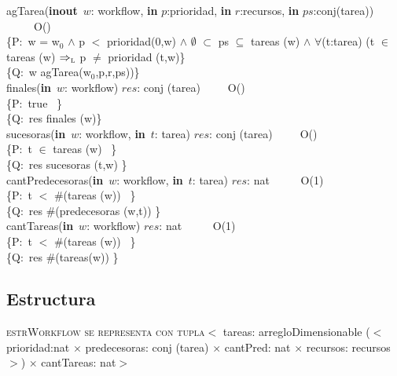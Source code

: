 \documentclass[a4paper,10pt]{article}
\begin{document}
\noindent agTarea(\textbf{inout}\ $w$: workflow, \textbf{in} $p$:prioridad, \textbf{in} $r$:recursos, \textbf{in} $ps$:conj(tarea))  \ \ \ \ \ O()\\
\indent \{P:\ w = w$_0$ $\wedge$ p $<$ prioridad(0,w) $\wedge$ $\emptyset$ $\subset$ ps $\subseteq$ tareas (w) $\wedge$ $\forall$(t:tarea) (t $\in$ tareas (w) $\Rightarrow_{\mathrm{\scriptscriptstyle{L}}}$ p $\neq$ prioridad (t,w)\}\\
\indent \{Q:\ w  \igobs agTarea(w$_0$,p,r,ps))\}\\

\noindent finales(\textbf{in}\ $w$: workflow)  \en $res$: conj (tarea)\ \ \ \ \ O()\\
\indent \{P:\ true \ \}  \\
\indent \{Q:\ res \igobs finales (w)\}\\


\noindent sucesoras(\textbf{in}\ $w$: workflow, \textbf{in}\ $t$: tarea)  \en $res$: conj (tarea)\ \ \ \ \ O()\\
\indent \{P:\ t $\in$ tareas (w) \ \}  \\
\indent \{Q:\ res \igobs sucesoras (t,w) \}\\

\noindent cantPredecesoras(\textbf{in}\ $w$: workflow, \textbf{in}\ $t$: tarea)  \en $res$: nat \ \ \ \ \ O(1)\\
\indent \{P:\ t $<$ $\#$(tareas (w)) \ \}  \\
\indent \{Q:\ res \igobs $\#$(predecesoras (w,t)) \}\\


\noindent cantTareas(\textbf{in}\ $w$: workflow)  \en $res$: nat \ \ \ \ \ O(1)\\
\indent \{P:\ t $<$ $\#$(tareas (w)) \ \}  \\
\indent \{Q:\ res \igobs $\#$(tareas(w)) \}\\

\newpage

\subsection{Estructura}
    
    
    
    \noindent \textsc{estrWorkflow se representa con tupla}$<$ tareas: arregloDimensionable ($<$prioridad:nat $\times$ 
	predecesoras: conj (tarea) $\times$ cantPred: nat $\times$ 
	recursos: recursos$>$) $\times$ cantTareas: nat$>$\\
	
\end{document}
